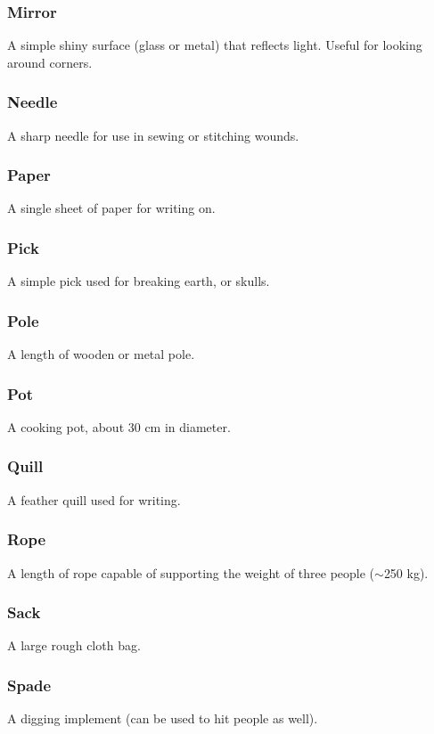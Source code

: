 \documentclass[a4paper,11pt,oneside]{book}
\begin{document}
\subsubsection{Mirror}
A simple shiny surface (glass or metal) that reflects light. Useful for looking around corners.

\subsubsection{Needle}
A sharp needle for use in sewing or stitching wounds.

\subsubsection{Paper}
A single sheet of paper for writing on.

\subsubsection{Pick}
A simple pick used for breaking earth, or skulls.

\subsubsection{Pole}
A length of wooden or metal pole.

\subsubsection{Pot}
A cooking pot, about 30 cm in diameter.

\subsubsection{Quill}
A feather quill used for writing.

\subsubsection{Rope}
A length of rope capable of supporting the weight of three people ($\sim$250 kg).

\subsubsection{Sack}
A large rough cloth bag.

\subsubsection{Spade}
A digging implement (can be used to hit people as well).
\end{document}
